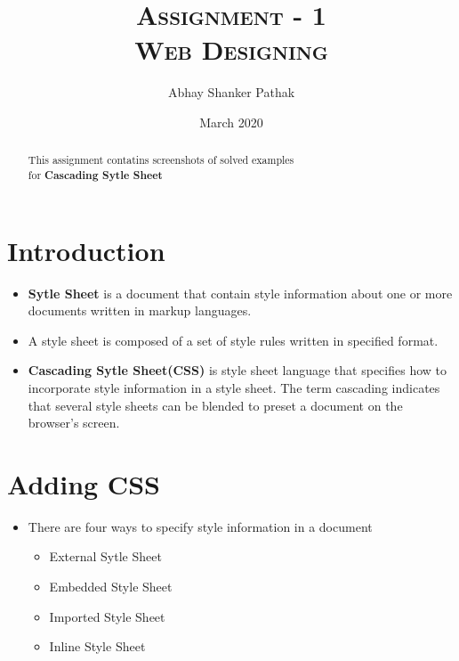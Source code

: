 \documentclass[a4paper,1pt,oneside]{article}
\title{\textsc{Assignment - 1\\Web Designing}}
\author{Abhay Shanker Pathak}
\date{March 2020}
\begin{document}
\maketitle
\setlength{\parindent}{1cm}

\renewcommand{\abstractname}{About}
\begin{abstract}
	\centering
	This assignment contatins screenshots of solved examples\\
	for \textbf{Cascading Sytle Sheet}
\end{abstract}

\tableofcontents
\listoftables
\listoffigures

\clearpage


\section{Introduction}

\begin{itemize}
	\item \textbf{Sytle Sheet} is a document that contain style information about one or more documents written in markup languages.
	\item A style sheet is composed of a set of style rules written in specified format.
	\item \textbf{Cascading Sytle Sheet(CSS)} is style sheet language that specifies how to incorporate style information in a style sheet. The term cascading indicates that several style sheets can be blended to preset a document on the browser's screen.
\end{itemize}

\section{Adding CSS}

\begin{itemize}
	\item There are four ways to specify style information in a document
		\begin{itemize}
			\item External Sytle Sheet
			\item Embedded Style Sheet
			\item Imported Style Sheet
			\item Inline Style Sheet
		\end{itemize}
\end{itemize}
\end{document}
